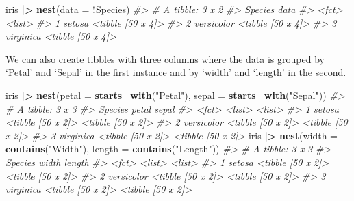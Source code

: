 \documentclass[
]{book}
\newenvironment{Shaded}{\begin{snugshade}}{\end{snugshade}}
\newcommand{\AttributeTok}[1]{\textcolor[rgb]{0.13,0.29,0.53}{#1}}
\newcommand{\CommentTok}[1]{\textcolor[rgb]{0.56,0.35,0.01}{\textit{#1}}}
\newcommand{\FunctionTok}[1]{\textcolor[rgb]{0.13,0.29,0.53}{\textbf{#1}}}
\newcommand{\NormalTok}[1]{#1}
\newcommand{\SpecialCharTok}[1]{\textcolor[rgb]{0.81,0.36,0.00}{\textbf{#1}}}
\newcommand{\StringTok}[1]{\textcolor[rgb]{0.31,0.60,0.02}{#1}}
\begin{document}
\begin{Shaded}
\begin{Highlighting}[]
\NormalTok{iris }\SpecialCharTok{|\textgreater{}} \FunctionTok{nest}\NormalTok{(}\AttributeTok{data =} \SpecialCharTok{!}\NormalTok{Species)}
\CommentTok{\#\textgreater{} \# A tibble: 3 x 2}
\CommentTok{\#\textgreater{}   Species    data             }
\CommentTok{\#\textgreater{}   \textless{}fct\textgreater{}      \textless{}list\textgreater{}           }
\CommentTok{\#\textgreater{} 1 setosa     \textless{}tibble [50 x 4]\textgreater{}}
\CommentTok{\#\textgreater{} 2 versicolor \textless{}tibble [50 x 4]\textgreater{}}
\CommentTok{\#\textgreater{} 3 virginica  \textless{}tibble [50 x 4]\textgreater{}}
\end{Highlighting}
\end{Shaded}

We can also create tibbles with three columns where the data is grouped by `Petal' and `Sepal' in the first instance and by `width' and `length' in the second.

\begin{Shaded}
\begin{Highlighting}[]
\NormalTok{iris }\SpecialCharTok{|\textgreater{}} \FunctionTok{nest}\NormalTok{(}\AttributeTok{petal =} \FunctionTok{starts\_with}\NormalTok{(}\StringTok{"Petal"}\NormalTok{), }\AttributeTok{sepal =} \FunctionTok{starts\_with}\NormalTok{(}\StringTok{"Sepal"}\NormalTok{))}
\CommentTok{\#\textgreater{} \# A tibble: 3 x 3}
\CommentTok{\#\textgreater{}   Species    petal             sepal            }
\CommentTok{\#\textgreater{}   \textless{}fct\textgreater{}      \textless{}list\textgreater{}            \textless{}list\textgreater{}           }
\CommentTok{\#\textgreater{} 1 setosa     \textless{}tibble [50 x 2]\textgreater{} \textless{}tibble [50 x 2]\textgreater{}}
\CommentTok{\#\textgreater{} 2 versicolor \textless{}tibble [50 x 2]\textgreater{} \textless{}tibble [50 x 2]\textgreater{}}
\CommentTok{\#\textgreater{} 3 virginica  \textless{}tibble [50 x 2]\textgreater{} \textless{}tibble [50 x 2]\textgreater{}}
\NormalTok{iris }\SpecialCharTok{|\textgreater{}} \FunctionTok{nest}\NormalTok{(}\AttributeTok{width =} \FunctionTok{contains}\NormalTok{(}\StringTok{"Width"}\NormalTok{), }\AttributeTok{length =} \FunctionTok{contains}\NormalTok{(}\StringTok{"Length"}\NormalTok{))}
\CommentTok{\#\textgreater{} \# A tibble: 3 x 3}
\CommentTok{\#\textgreater{}   Species    width             length           }
\CommentTok{\#\textgreater{}   \textless{}fct\textgreater{}      \textless{}list\textgreater{}            \textless{}list\textgreater{}           }
\CommentTok{\#\textgreater{} 1 setosa     \textless{}tibble [50 x 2]\textgreater{} \textless{}tibble [50 x 2]\textgreater{}}
\CommentTok{\#\textgreater{} 2 versicolor \textless{}tibble [50 x 2]\textgreater{} \textless{}tibble [50 x 2]\textgreater{}}
\CommentTok{\#\textgreater{} 3 virginica  \textless{}tibble [50 x 2]\textgreater{} \textless{}tibble [50 x 2]\textgreater{}}
\end{Highlighting}
\end{Shaded}
\end{document}
